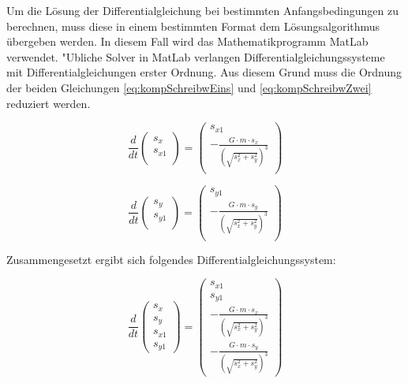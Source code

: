 \begin{refsection}
Um die Lösung der Differentialgleichung bei bestimmten Anfangsbedingungen zu berechnen, muss diese in einem bestimmten Format dem Lösungsalgorithmus übergeben werden.
In diesem Fall wird das Mathematikprogramm MatLab verwendet. 
"Ubliche Solver in MatLab verlangen Differentialgleichungssysteme mit Differentialgleichungen erster Ordnung.
Aus diesem Grund muss die Ordnung der beiden Gleichungen \ref{eq:kompSchreibwEins} und \ref{eq:kompSchreibwZwei} reduziert werden.

\begin{equation}
\frac{d}{dt} \begin{pmatrix}
s_x \\ 
s_{x1}\\
\end{pmatrix} = \begin{pmatrix}
s_{x1} \\ 
-\frac{G \cdot m \cdot s_x}{(\sqrt{s_x^2 + s_y^2})^3} \\
\end{pmatrix}
\end{equation}

\begin{equation}
\frac{d}{dt} \begin{pmatrix}
s_y \\ 
s_{y1}\\
\end{pmatrix} = \begin{pmatrix}
s_{y1} \\ 
-\frac{G \cdot m \cdot s_y}{(\sqrt{s_x^2 + s_y^2})^3} \\
\end{pmatrix}
\end{equation}

Zusammengesetzt ergibt sich folgendes Differentialgleichungssystem:

\begin{equation}
\frac{d}{dt} \begin{pmatrix}
s_x \\ 
s_y \\
s_{x1}\\
s_{y1}
\end{pmatrix} = \begin{pmatrix}
s_{x1} \\ 
s_{y1}\\
-\frac{G \cdot m \cdot s_x}{(\sqrt{s_x^2 + s_y^2})^3} \\
-\frac{G \cdot m \cdot s_y}{(\sqrt{s_x^2 + s_y^2})^3}
\end{pmatrix}
\end{equation}


\end{refsection}

